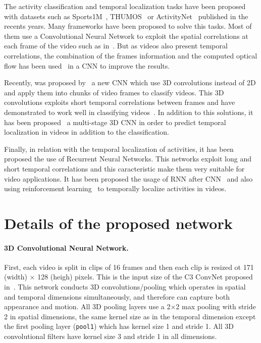 \documentclass{article}
\begin{document}
The activity classification and temporal localization tasks have been proposed with datasets such as Sports1M~\cite{KarpathyCVPR14}, THUMOS~\cite{THUMOS15} or ActivityNet~\cite{caba2015activitynet} published in the recents years. Many frameworks have been proposed to solve this tasks.
Most of them use a Convolutional Neural Network to exploit the spatial correlations at each frame of the video such as in~\cite{gkioxari2015contextual,yeung2015end,ballas2015delving}.
But as videos also present temporal correlations, the combination of the frames information and the computed optical flow has been used~\cite{wang2015towards} in a CNN to improve the results.

Recently, was proposed by~\cite{tran2014learning} a new CNN which use 3D convolutions instead of 2D and apply them into chunks of video frames to classify videos. This 3D convolutions exploits short temporal correlations between frames and have demonstrated to work well in classifying videos~\cite{tran2014learning,tran2015deep}.
In addition to this solutions, it has been proposed~\cite{shoutemporal} a multi-stage 3D CNN in order to predict temporal localization in videos in addition to the classification.

Finally, in relation with the temporal localization of activities, it has been proposed the use of Recurrent Neural Networks.
This networks exploit long and short temporal correlations and this caracteristic make them very suitable for video applications.
It has been proposed the usage of RNN after CNN~\cite{yao2015describing} and also using reinforcement learning~\cite{yeung2015every} to temporally localize activities in videos.

\section{Details of the proposed network}

\paragraph{3D Convolutional Neural Network.}
First, each video is split in clips of 16 frames and then each clip is resized ot 171 (width) $\times$ 128 (heigh) pixels.
This is the input size of the C3 ConvNet proposed in~\cite{tran2014learning}.
This network conducts 3D convolutions/pooling which operates in spatial and temporal dimensions simultaneously, and therefore can capture both appearance and motion.
All 3D pooling layers use a 2$\times$2 max pooling with stride 2 in spatial dimensions, the same kernel size as in the temporal dimension except the first pooling layer (\texttt{pool1}) which has kernel size 1 and stride 1. All 3D convolutional filters have kernel size 3 and stride 1 in all dimensions.
\end{document}
